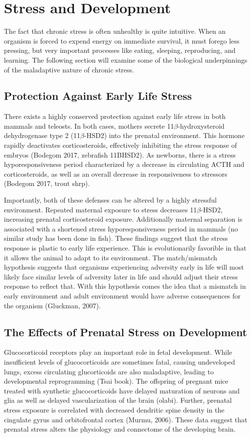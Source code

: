 \documentclass[12pt,twoside]{reedthesis}
\begin{document}
\section{Stress and Development}
The fact that chronic stress is often unhealthy is quite intuitive. When an
organism is forced to expend energy on immediate survival, it must forego less
pressing, but very important processes like eating, sleeping, reproducing, and
learning. The following section will examine some of the biological
underpinnings of the maladaptive nature of chronic stress.  

\subsection{Protection Against Early Life Stress} 

There exists a highly conserved protection against early life stress in both
mammals and teleosts. In both cases, mothers secrete 11$\beta$-hydroxysteroid
dehydrogenase type 2 (11$\beta$-HSD2) into the prenatal environment. This hormone rapidly deactivates corticosteroids, effectively
inhibiting the stress response of embryos (Bodegom 2017, zebrafish 11BHSD2). As
newborns, there is a stress hyporesponsiveness period characterized by a
decrease in circulating ACTH and corticosteroids, as well as an overall decrease
in responsiveness to stressors (Bodegom 2017, trout shrp).

Importantly, both of these defenses can be altered by a highly stressful
environment. Repeated maternal exposure to stress decreases 11$\beta$-HSD2,
increasing prenatal corticosteroid exposure. Additionally maternal separation is
associated with a shortened stress hyporesponsiveness period in mammals (no
similar study has been done in fish). These findings suggest that the stress
response is plastic to early life experience. This is
evolutionarily favorible in that it allows the animal to adapt to its
environment. The match/mismatch hypothesis suggests that organisms experiencing
adversity early in life will most likely face similar levels of adversity later
in life and should adjust their stress response to reflect that. With this
hypothesis comes the idea that a mismatch in early environment and adult
environment would have adverse consequences for the organism (Gluckman, 2007). 

\subsection{The Effects of Prenatal Stress on Development}
Glucocorticoid receptors play an important role in fetal development. While
insufficient levels of glucocorticoids are sometimes fatal, causing undeveloped lungs,
excess circulating glucorticoids are also maladaptive, leading to developmental
reprogramming (Tsai book). The offspring of pregnant mice treated with synthetic glucocorticoids
 have delayed maturation of neurons and glia as well as delayed vascularization
 of the brain (olabi). Further, prenatal stress exposure is correlated with
 decreased dendritic spine density in the cingulate gyrus and orbitofrontal
 cortex (Murmu, 2006). These data suggest that prenatal stress alters the
 physiology and connectome of the developing brain.
\end{document}
